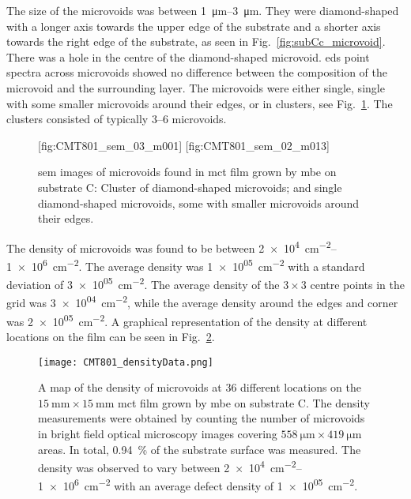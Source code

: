 The size of the microvoids was between \SIrange{1}{3}{\micro\metre}. They were diamond-shaped with a longer axis towards the upper edge of the substrate and a shorter axis towards the right edge of the substrate, as seen in Fig.~\ref{fig:subCc_microvoid}. There was a hole in the centre of the diamond-shaped microvoid. \Ac{eds} point spectra across microvoids showed no difference between the composition of the microvoid and the surrounding layer. The microvoids were either single, single with some smaller microvoids around their edges, or in clusters, see Fig.~\ref{fig:subCc_sem_microvoids}. The clusters consisted of typically \SIrange{3}{6}{} microvoids.


\begin{figure}[htbp]
    \centering
    [fig:CMT801_sem_03_m001]
    \hfill
    [fig:CMT801_sem_02_m013]
    \caption[\Ac{sem} images of microvoids found in \ac{mct} film grown by \ac{mbe} on substrate C.]{\Ac{sem} images of microvoids found in \ac{mct} film grown by \ac{mbe} on substrate C:  Cluster of diamond-shaped microvoids; and  single diamond-shaped microvoids, some with smaller microvoids around their edges.}
    \label{fig:subCc_sem_microvoids}
\end{figure}

The density of microvoids was found to be between \SIrange{2e+4}{1e+6}{\centi\metre^{-2}}. The average density was \SI{1e+05}{\centi\metre^{-2}} with a standard deviation of \SI{3e+05}{\centi\metre^{-2}}. The average density of the $3\times3$ centre points in the grid was \SI{3e+04}{\centi\metre^{-2}}, while the average density around the edges and corner was \SI{2e+05}{\centi\metre^{-2}}. A graphical representation of the density at different locations on the film can be seen in Fig.~\ref{fig:CMT801_densityData}. 

\begin{figure}[htbp]
    \centering
    \texttt{[image: CMT801\_densityData.png]}
    \caption[Map of the density of microvoids on the \ac{mct} film grown on substrate C.]{A map of the density of microvoids at 36 different locations on the $\SI{15}{\milli\metre}\times\SI{15}{\milli\metre}$ \ac{mct} film grown by \ac{mbe} on substrate C. The density measurements were obtained by counting the number of microvoids in bright field optical microscopy images covering $\SI{558}{\micro\metre}\times\SI{419}{\micro\metre}$ areas. In total, \SI{0.94}{\percent} of the substrate surface was measured. The density was observed to vary between \SIrange{2e+4}{1e+6}{\centi\metre^{-2}} with an average defect density of \SI{1e+05}{\centi\metre^{-2}}.}
    \label{fig:CMT801_densityData}
\end{figure}

